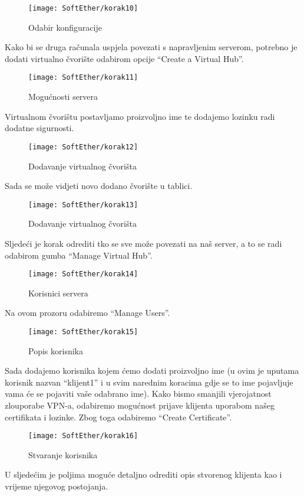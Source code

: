 \begin{figure}[h!]
     \centering
     \texttt{[image: SoftEther/korak10]}
     \caption{Odabir konfiguracije}
\end{figure}
\FloatBarrier
Kako bi se druga računala uspjela povezati s napravljenim serverom, potrebno je dodati virtualno čvorište odabirom opcije ``Create a Virtual Hub''.
\begin{figure}[h!]
     \centering
     \texttt{[image: SoftEther/korak11]}
     \caption{Mogućnosti servera}
\end{figure}
\FloatBarrier
Virtualnom čvorištu postavljamo proizvoljno ime te dodajemo lozinku radi dodatne sigurnosti.
\begin{figure}[h!]
     \centering
     \texttt{[image: SoftEther/korak12]}
     \caption{Dodavanje virtualnog čvorišta}
\end{figure}
\FloatBarrier
Sada se može vidjeti novo dodano čvorište u tablici.
\begin{figure}[h!]
     \centering
     \texttt{[image: SoftEther/korak13]}
     \caption{Dodavanje virtualnog čvorišta}
\end{figure}
\FloatBarrier
Sljedeći je korak odrediti tko se sve može povezati na naš server, a to se radi odabirom gumba ``Manage Virtual Hub''.
\begin{figure}[h!]
     \centering
     \texttt{[image: SoftEther/korak14]}
     \caption{Korisnici servera}
\end{figure}
\FloatBarrier
Na ovom prozoru odabiremo ``Manage Users''.
\begin{figure}[h!]
     \centering
     \texttt{[image: SoftEther/korak15]}
     \caption{Popis korisnika}
\end{figure}
\FloatBarrier
Sada dodajemo korisnika kojem ćemo dodati proizvoljno ime (u ovim je uputama korisnik nazvan ``klijent1'' i u svim narednim koracima gdje se to ime pojavljuje vama će se pojaviti vaše odabrano ime). Kako bismo smanjili vjerojatnost zlouporabe VPN-a, odabiremo mogućnost prijave klijenta uporabom našeg certifikata i lozinke. Zbog toga odabiremo ``Create Certificate''.
\begin{figure}[h!]
     \centering
     \texttt{[image: SoftEther/korak16]}
     \caption{Stvaranje korisnika}
\end{figure}
\FloatBarrier
U sljedećim je poljima moguće detaljno odrediti opis stvorenog klijenta kao i vrijeme njegovog postojanja.
